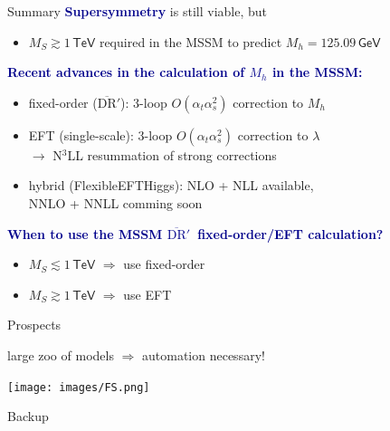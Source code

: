 \documentclass[hyperref={pdfpagelabels=false},ngerman]{beamer}
\newcommand{\eh}[1]{\,\mathsf{#1}}
\newcommand{\MS}{\ensuremath{M_S}}
\renewcommand{\emph}[1]{\textbf{\textcolor{darkblue}{#1}}}
\newcommand{\DRbarp}{\ensuremath{\overline{\text{DR}}'}}
\newcommand{\at}{\alpha_t}
\newcommand{\as}{\alpha_s}
\newcommand{\GeV}{\eh{GeV}}
\newcommand{\TeV}{\eh{TeV}}
\begin{document}
\begin{frame}{Summary}
  \emph{Supersymmetry} is still viable, but
  \begin{itemize}
  \item $\MS \gtrsim 1\TeV$ required in the MSSM to predict
    $M_h = 125.09\GeV$
  \end{itemize}
  \vspace{1em}
  \emph{Recent advances in the calculation of $M_h$ in the MSSM:}
  \begin{itemize}
  \item fixed-order (\DRbarp): 3-loop $O(\at\as^2)$ correction to $M_h$
  \item EFT (single-scale): 3-loop $O(\at\as^2)$ correction to $\lambda$ \\
    $\rightarrow$ N$^3$LL resummation of strong corrections
  \item hybrid (FlexibleEFTHiggs): NLO + NLL available, \\
    NNLO + NNLL comming soon
  \end{itemize}
  \vspace{1em}
  \emph{When to use the MSSM \DRbarp\ fixed-order/EFT calculation?}
  \begin{itemize}
  \item $\MS \lesssim 1\TeV$ $\Rightarrow$ use fixed-order
  \item $\MS \gtrsim  1\TeV$ $\Rightarrow$ use EFT
  \end{itemize}
\end{frame}

\begin{frame}{Prospects}
  \begin{center}
    \LARGE large zoo of models $\Rightarrow$ automation necessary!
  \end{center}
  \begin{center}
    \texttt{[image: images/FS.png]}
  \end{center}
\end{frame}


\begin{frame}[noframenumbering]
  \begin{center}
    \Huge Backup
  \end{center}
\end{frame}
\end{document}
